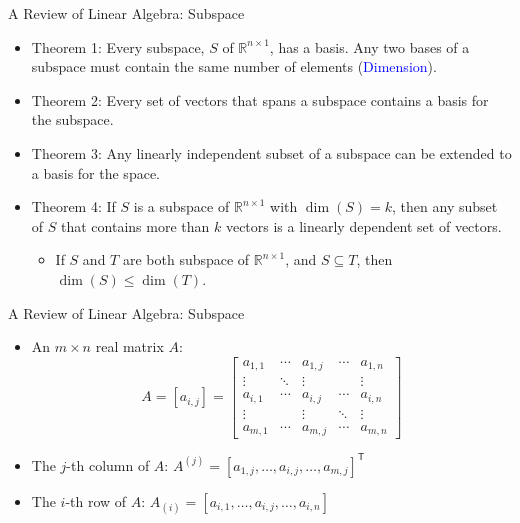 \documentclass[aspectratio=169,hyperref,UTF8,CJK]{beamer}
\newcommand{\R}{\mathbb{R}}
\newcommand{\trans}{\mathsf{T}}
\begin{document}
\begin{frame}{A Review of Linear Algebra: Subspace}
  \small
  \begin{itemize}
    \item Theorem 1: Every subspace, $S$ of $\R^{n\times1}$, has a basis. Any two bases of a subspace must contain the same number of elements (\textcolor{blue}{Dimension}).
    \item Theorem 2: Every set of vectors that spans a subspace contains a basis for the subspace.
    \item Theorem 3: Any linearly independent subset of a subspace can be extended to a basis for the space.
    \item Theorem 4: If $S$ is a subspace of $\R^{n\times1}$ with $\dim(S)=k$, then any subset of $S$ that contains more than $k$ vectors is a linearly dependent set of vectors.
      \begin{itemize}
        \item If $S$ and $T$ are both subspace of $\R^{n\times1}$, and $S\subseteq T$, then $\dim(S)\le\dim(T)$.
      \end{itemize}
  \end{itemize}
\end{frame}

\begin{frame}{A Review of Linear Algebra: Subspace}
  \small
  \begin{itemize}
    \item An $m\times n$ real matrix $A$:
      \begin{equation*}
        A=[a_{i,j}]=\begin{bmatrix}
          a_{1,1}&\cdots&a_{1,j}&\cdots&a_{1,n}\\
          \vdots&\ddots&\vdots&&\vdots\\
          a_{i,1}&\cdots&a_{i,j}&\cdots&a_{i,n}\\
          \vdots&&\vdots&\ddots&\vdots\\
          a_{m,1}&\cdots&a_{m,j}&\cdots&a_{m,n}
        \end{bmatrix}
      \end{equation*}
    \item The $j$-th column of $A$: $A^{(j)}=[a_{1,j},\ldots,a_{i,j},\ldots,a_{m,j}]^{\trans}$
    \item The $i$-th row of $A$: $A_{(i)}=[a_{i,1},\ldots,a_{i,j},\ldots,a_{i,n}]$
  \end{itemize}
\end{frame}
\end{document}
